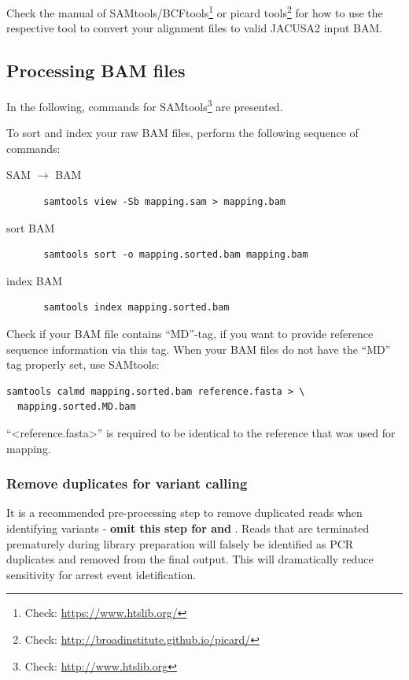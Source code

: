 \documentclass[10pt,a4paper,final]{article}
\begin{document}
Check the manual of SAMtools/BCFtools\footnote{Check: \url{https://www.htslib.org/}} or
picard tools\footnote{Check: \url{http://broadinstitute.github.io/picard/}} for how to use the respective 
tool to convert your alignment files to valid JACUSA2 input BAM.
\subsection{Processing BAM files}
In the following, commands for SAMtools\footnote{Check: \url{http://www.htslib.org}} are presented.

To sort and index your raw BAM files, perform the following sequence of commands:
\begin{description}
  \item[SAM $\rightarrow$ BAM] \begin{verbatim} samtools view -Sb mapping.sam > mapping.bam \end{verbatim} 
  \item[sort BAM] \begin{verbatim} samtools sort -o mapping.sorted.bam mapping.bam \end{verbatim} 
  \item[index BAM] \begin{verbatim} samtools index mapping.sorted.bam \end{verbatim}
\end{description}

Check if your BAM file contains ``MD''-tag, if you want to provide reference sequence information 
via this tag. When your BAM files do not have the ``MD'' tag properly set, use SAMtools:
\begin{verbatim}
samtools calmd mapping.sorted.bam reference.fasta > \
  mapping.sorted.MD.bam
\end{verbatim}
``<reference.fasta>'' is required to be identical to the reference that was used for mapping. 
\subsubsection{Remove duplicates for variant calling}
It is a recommended pre-processing step to remove duplicated reads when identifying variants -
\textbf{omit this step for \rtarrest and \lrtarrest}. Reads that are terminated prematurely during
library preparation will falsely be identified as PCR duplicates and removed from the final output.
This will dramatically reduce sensitivity for arrest event idetification.
\end{document}
